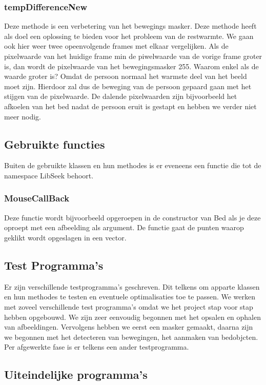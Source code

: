  \subsubsection{tempDifferenceNew}
 Deze methode is een verbetering van het bewegings masker. Deze methode heeft als doel een oplossing te bieden voor het probleem van de restwarmte. We gaan ook hier weer twee opeenvolgende frames met elkaar vergelijken. Als de pixelwaarde van het huidige frame min de piwelwaarde van de vorige frame groter is, dan wordt de pixelwaarde van het bewegingsmasker 255. Waarom enkel als de waarde groter is? Omdat de persoon normaal het warmste deel van het beeld moet zijn. Hierdoor zal dus de beweging van de persoon gepaard gaan met het stijgen van de pixelwaarde. De dalende pixelwaarden zijn bijvoorbeeld het afkoelen van het bed nadat de persoon eruit is gestapt en hebben we verder niet meer nodig. 

\subsection{Gebruikte functies}
\label{MRefGFu}
Buiten de gebruikte klassen en hun methodes is er eveneens een functie die tot de namespace LibSeek behoort.

\subsubsection{MouseCallBack}
Deze functie wordt bijvoorbeeld opgeroepen in de constructor van Bed als je deze oproept met een afbeelding als argument. De functie gaat de punten waarop geklikt wordt opgeslagen in een vector. 

\subsection{Test Programma's}
\label{mRefTPr}
Er zijn verschillende testprogramma's geschreven. Dit telkens om apparte klassen en hun methodes te testen en eventuele optimalisaties toe te passen. We werken met zoveel verschillende test programma's omdat we het project stap voor stap hebben opgebouwd. We zijn zeer eenvoudig begonnen met het opsalen en ophalen van afbeeldingen. Vervolgens hebben we eerst een masker gemaakt, daarna zijn we begonnen met het detecteren van bewegingen, het aanmaken van bedobjcten. Per afgewerkte fase is er telkens een ander testprogramma.

\subsection{Uiteindelijke programma's}
